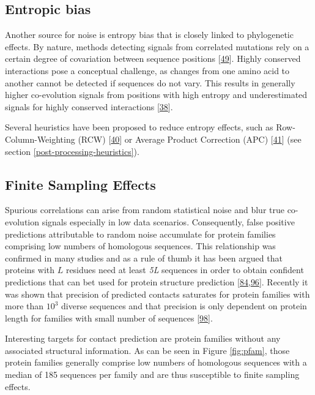 \documentclass[12pt,a4paper,twoside]{book}
\theoremstyle{definition}
\theoremstyle{definition}
\theoremstyle{remark}
\begin{document}
\subsection*{Entropic bias}\label{entropic-bias}

Another source for noise is entropy bias that is closely linked to
phylogenetic effects. By nature, methods detecting signals from
correlated mutations rely on a certain degree of covariation between
sequence positions {[}\protect\hyperlink{ref-Burger2010}{49}{]}. Highly
conserved interactions pose a conceptual challenge, as changes from one
amino acid to another cannot be detected if sequences do not vary. This
results in generally higher co-evolution signals from positions with
high entropy and underestimated signals for highly conserved
interactions {[}\protect\hyperlink{ref-Fodor2004}{38}{]}.

Several heuristics have been proposed to reduce entropy effects, such as
Row-Column-Weighting (RCW)
{[}\protect\hyperlink{ref-Gouveia_Oliveira2007}{40}{]} or Average
Product Correction (APC) {[}\protect\hyperlink{ref-Dunn2008}{41}{]} (see
section \ref{post-processing-heuristics}).

\subsection*{Finite Sampling Effects}\label{finite-sampling-effects}

Spurious correlations can arise from random statistical noise and blur
true co-evolution signals especially in low data scenarios.
Consequently, false positive predictions attributable to random noise
accumulate for protein families comprising low numbers of homologous
sequences. This relationship was confirmed in many studies and as a rule
of thumb it has been argued that proteins with \(L\) residues need at
least \emph{5L} sequences in order to obtain confident predictions that
can bet used for protein structure prediction
{[}\protect\hyperlink{ref-Kamisetty2013}{84},\protect\hyperlink{ref-Marks2012}{96}{]}.
Recently it was shown that precision of predicted contacts saturates for
protein families with more than \(10^3\) diverse sequences and that
precision is only dependent on protein length for families with small
number of sequences {[}\protect\hyperlink{ref-Anishchenko2017}{98}{]}.

Interesting targets for contact prediction are protein families without
any associated structural information. As can be seen in Figure
\ref{fig:pfam}, those protein families generally comprise low numbers of
homologous sequences with a median of 185 sequences per family and are
thus susceptible to finite sampling effects.
\end{document}
